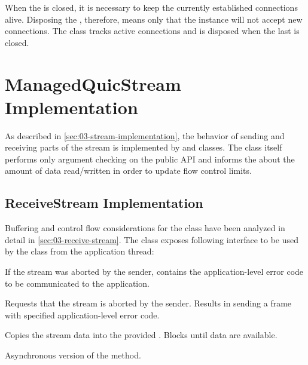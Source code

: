 When the \ManagedQuicListener{} is closed, it is necessary to keep the currently established
connections alive. Disposing the \ManagedQuicListener{}, therefore, means only that the
\QuicServerSocketContext{} instance will not accept new connections. The \QuicServerSocketContext{}
class tracks active connections and is disposed when the last \ManagedQuicConnection{} is
closed.

\section{ManagedQuicStream Implementation}

As described in \autoref{sec:03-stream-implementation}, the behavior of sending and receiving parts
of the stream is implemented by \ReceiveStream{} and \SendStream{} classes. The \ManagedQuicStream{}
class itself performs only argument checking on the public API and informs the
\ManagedQuicConnection{} about the amount of data read/written in order to update flow control
limits.

\subsection{ReceiveStream Implementation}

Buffering and control flow considerations for the \ReceiveStream{} class have been analyzed in
detail in \autoref{sec:03-receive-stream}. The \ReceiveStream{} class exposes following interface to
be used by the \ManagedQuicStream{} class from the application thread:

\begin{description}

  If the stream was aborted by the sender, contains the application-level error code to be
  communicated to the application.

  Requests that the stream is aborted by the sender. Results in sending a \STOPSENDING{} frame with
  specified application-level error code.

  Copies the stream data into the provided \SpanOf{\byte{}}. Blocks until data are available.

  Asynchronous version of the  method.

\end{description}

